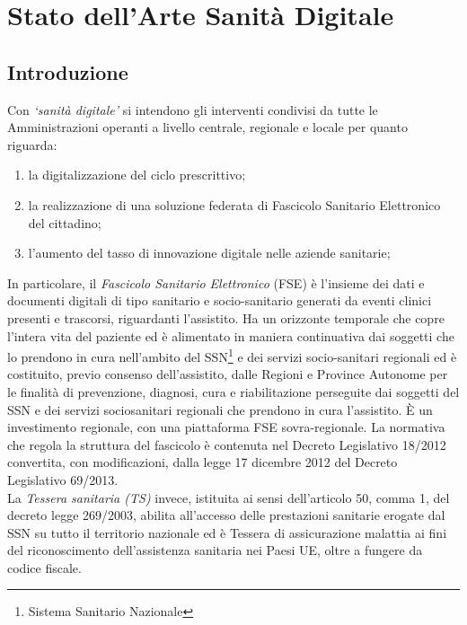 %
%
\chapter{Stato dell'Arte Sanità Digitale} %
%
\label{cap:sanitàdigitale}
%
\section{Introduzione}
%
Con \emph{\enquote*{sanità digitale}} si intendono gli interventi condivisi da tutte le Amministrazioni operanti a livello centrale, regionale e locale per quanto riguarda: 
\begin{enumerate}
	\item la digitalizzazione del ciclo prescrittivo;
	\item la realizzazione di una soluzione federata di Fascicolo Sanitario Elettronico del cittadino;
	\item l’aumento del tasso di innovazione digitale nelle aziende sanitarie;
\end{enumerate}
In particolare, il \emph{Fascicolo Sanitario Elettronico} (FSE) è l’insieme dei dati e documenti digitali di tipo sanitario e socio-sanitario generati da eventi clinici presenti e trascorsi, riguardanti l’assistito. Ha un orizzonte temporale che copre l’intera vita del paziente ed è alimentato in maniera continuativa dai soggetti che lo prendono in cura nell’ambito del SSN\footnote{Sistema Sanitario Nazionale} e dei servizi socio-sanitari regionali ed è costituito, previo consenso dell’assistito, dalle Regioni e Province Autonome per le finalità di prevenzione, diagnosi, cura e riabilitazione perseguite dai soggetti del SSN e dei servizi sociosanitari regionali che prendono in cura l’assistito. È un investimento regionale, con una piattaforma FSE sovra-regionale. 
La normativa che regola la struttura del fascicolo è contenuta nel Decreto Legislativo 18/2012\cite{normaFSE} convertita, con modificazioni, dalla legge 17 dicembre 2012 del Decreto Legislativo 69/2013\autocite{decretofare}.\\
La \emph{Tessera sanitaria (TS)} invece, istituita ai sensi dell’articolo 50, comma 1, del decreto legge 269/2003, abilita all'accesso delle prestazioni sanitarie erogate dal SSN su tutto il territorio nazionale ed è Tessera di assicurazione malattia ai fini del riconoscimento dell'assistenza sanitaria nei Paesi UE, oltre a fungere da codice fiscale.\\
